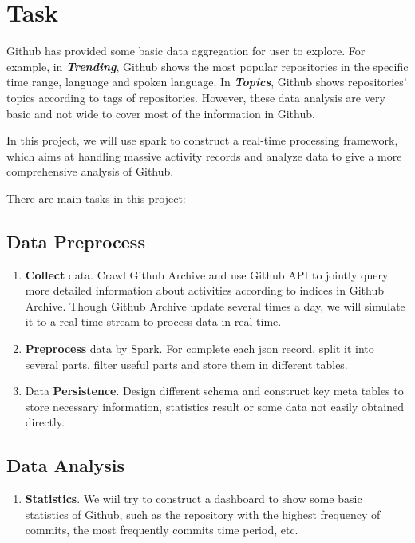 \section{Task}

Github has provided some basic data aggregation for user to explore. For example, in \textbf{\textit{Trending\cite{ghtrending}}}, Github shows the most popular repositories in the specific time range, language and spoken language. In \textbf{\textit{Topics\cite{ghtopics}}}, Github shows repositories' topics according to tags of repositories. However, these data analysis are very basic and not wide to cover most of the information in Github.

In this project, we will use spark to construct a real-time processing framework, which aims at handling massive activity records and analyze data to give a more comprehensive analysis of Github.

There are main tasks in this project:

\subsection{Data Preprocess}

\begin{enumerate}
    \item \textbf{Collect} data. Crawl Github Archive\cite{gha} and use Github API\cite{ghapi} to jointly query more detailed information about activities according to indices in Github Archive. Though Github Archive update several times a day, we will simulate it to a real-time stream to process data in real-time. 
    \item \textbf{Preprocess} data by Spark. For complete each json record, split it into several parts, filter useful parts and store them in different tables.
    \item Data \textbf{Persistence}. Design different schema and construct key meta tables to store necessary information, statistics result or some data not easily obtained directly.
\end{enumerate}

\subsection{Data Analysis}

\begin{enumerate}
    \item \textbf{Statistics}. We wiil try to construct a dashboard to show some basic statistics of Github, such as the repository with the highest frequency of commits, the most frequently commits time period, etc.
\end{enumerate}


